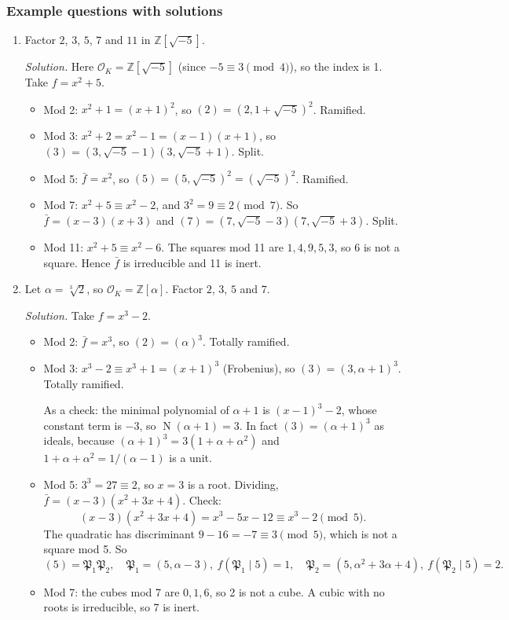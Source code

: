 \documentclass[11pt]{article}
\newcommand{\Z}{\mathbb{Z}}
\newcommand{\OK}{\mathcal{O}_K}
\newcommand{\fP}{\mathfrak{P}}
\DeclareMathOperator{\Nm}{N}
\begin{document}
\subsubsection*{Example questions with solutions}
\begin{enumerate}[label=\textbf{Q5.\arabic*}]
  \item Factor $2$, $3$, $5$, $7$ and $11$ in $\Z[\sqrt{-5}]$.

  \textit{Solution.} Here $\OK=\Z[\sqrt{-5}]$ (since $-5\equiv3\pmod4$), so the index is 1. Take $f=x^2+5$.
  \begin{itemize}
    \item Mod 2: $x^2+1=(x+1)^2$, so $(2)=(2,1+\sqrt{-5})^2$. Ramified.
    \item Mod 3: $x^2+2=x^2-1=(x-1)(x+1)$, so $(3)=(3,\sqrt{-5}-1)(3,\sqrt{-5}+1)$. Split.
    \item Mod 5: $\bar f=x^2$, so $(5)=(5,\sqrt{-5})^2=(\sqrt{-5})^2$. Ramified.
    \item Mod 7: $x^2+5\equiv x^2-2$, and $3^2=9\equiv2\pmod 7$. So $\bar f=(x-3)(x+3)$ and $(7)=(7,\sqrt{-5}-3)(7,\sqrt{-5}+3)$. Split.
    \item Mod 11: $x^2+5\equiv x^2-6$. The squares mod 11 are $1,4,9,5,3$, so 6 is not a square. Hence $\bar f$ is irreducible and 11 is inert.
  \end{itemize}

  \item Let $\alpha=\sqrt[3]2$, so $\OK=\Z[\alpha]$. Factor $2$, $3$, $5$ and $7$.

  \textit{Solution.} Take $f=x^3-2$.
  \begin{itemize}
    \item Mod 2: $\bar f=x^3$, so $(2)=(\alpha)^3$. Totally ramified.
    \item Mod 3: $x^3-2\equiv x^3+1=(x+1)^3$ (Frobenius), so $(3)=(3,\alpha+1)^3$. Totally ramified.

    As a check: the minimal polynomial of $\alpha+1$ is $(x-1)^3-2$, whose constant term is $-3$, so $\Nm(\alpha+1)=3$. In fact $(3)=(\alpha+1)^3$ as ideals, because $(\alpha+1)^3=3(1+\alpha+\alpha^2)$ and $1+\alpha+\alpha^2=1/(\alpha-1)$ is a unit.
    \item Mod 5: $3^3=27\equiv2$, so $x=3$ is a root. Dividing, $\bar f=(x-3)(x^2+3x+4)$. Check:
    \[
    (x-3)(x^2+3x+4)=x^3-5x-12\equiv x^3-2\pmod 5.
    \]
    The quadratic has discriminant $9-16=-7\equiv3\pmod 5$, which is not a square mod 5. So
    \[
    (5)=\fP_1\fP_2,\quad \fP_1=(5,\alpha-3),\ f(\fP_1\mid5)=1,\quad \fP_2=(5,\alpha^2+3\alpha+4),\ f(\fP_2\mid5)=2.
    \]
    \item Mod 7: the cubes mod 7 are $0,1,6$, so 2 is not a cube. A cubic with no roots is irreducible, so 7 is inert.
  \end{itemize}


\end{enumerate}
\end{document}
